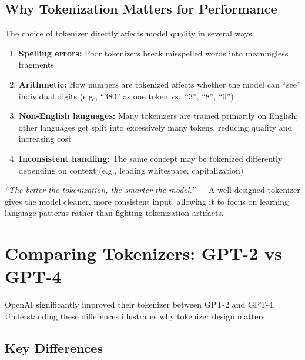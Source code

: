\documentclass[11pt,a4paper]{article}
\begin{document}
\subsection{Why Tokenization Matters for Performance}

The choice of tokenizer directly affects model quality in several ways:

\begin{enumerate}[leftmargin=1.5em]
    \item \textbf{Spelling errors:} Poor tokenizers break misspelled words into meaningless fragments
    \item \textbf{Arithmetic:} How numbers are tokenized affects whether the model can ``see'' individual digits (e.g., ``380'' as one token vs.\ ``3'', ``8'', ``0'')
    \item \textbf{Non-English languages:} Many tokenizers are trained primarily on English; other languages get split into excessively many tokens, reducing quality and increasing cost
    \item \textbf{Inconsistent handling:} The same concept may be tokenized differently depending on context (e.g., leading whitespace, capitalization)
\end{enumerate}

\begin{tcolorbox}[intuitionbox={The Golden Rule}]
\textit{``The better the tokenization, the smarter the model.''} --- A well-designed tokenizer gives the model cleaner, more consistent input, allowing it to focus on learning language patterns rather than fighting tokenization artifacts.
\end{tcolorbox}

\section{Comparing Tokenizers: GPT-2 vs GPT-4}

OpenAI significantly improved their tokenizer between GPT-2 and GPT-4. Understanding these differences illustrates why tokenizer design matters.

\subsection{Key Differences}
\end{document}
